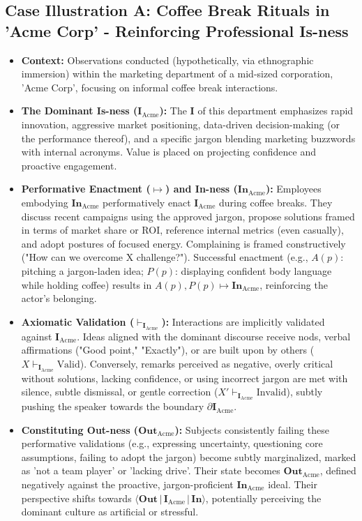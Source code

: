 \documentclass{article}
\newcommand{\Isness}{\mathbf{I}}            %
\newcommand{\Inness}{\mathbf{In}}           %
\newcommand{\Outness}{\mathbf{Out}}         %
\newcommand{\enactment}{\ensuremath{\mapsto}} %
\newcommand{\validates}[1]{\ensuremath{\vdash_{#1}}} %
\newcommand{\boundary}[1]{\ensuremath{\partial #1}} %
\newcommand{\orientation}[3]{\ensuremath{\langle #1 \,|\, #2 \,|\, #3 \rangle}} %
\begin{document}

\subsection{Case Illustration A: Coffee Break Rituals in 'Acme Corp' - Reinforcing Professional Is-ness}

\begin{itemize}
    \item \textbf{Context:} Observations conducted (hypothetically, via ethnographic immersion) within the marketing department of a mid-sized corporation, 'Acme Corp', focusing on informal coffee break interactions.
    \item \textbf{The Dominant Is-ness ($\Isness_{\text{Acme}}$):} The $\Isness$ of this department emphasizes rapid innovation, aggressive market positioning, data-driven decision-making (or the performance thereof), and a specific jargon blending marketing buzzwords with internal acronyms. Value is placed on projecting confidence and proactive engagement.
    \item \textbf{Performative Enactment ($\enactment$) and In-ness ($\Inness_{\text{Acme}}$):} Employees embodying $\Inness_{\text{Acme}}$ performatively enact $\Isness_{\text{Acme}}$ during coffee breaks. They discuss recent campaigns using the approved jargon, propose solutions framed in terms of market share or ROI, reference internal metrics (even casually), and adopt postures of focused energy. Complaining is framed constructively ("How can we overcome X challenge?"). Successful enactment (e.g., $A(p)$: pitching a jargon-laden idea; $P(p)$: displaying confident body language while holding coffee) results in $A(p), P(p) \enactment \Inness_{\text{Acme}}$, reinforcing the actor's belonging.
    \item \textbf{Axiomatic Validation ($\validates{\Isness_{\text{Acme}}}$):} Interactions are implicitly validated against $\Isness_{\text{Acme}}$. Ideas aligned with the dominant discourse receive nods, verbal affirmations ("Good point," "Exactly"), or are built upon by others ($X \validates{\Isness_{\text{Acme}}} \text{Valid}$). Conversely, remarks perceived as negative, overly critical without solutions, lacking confidence, or using incorrect jargon are met with silence, subtle dismissal, or gentle correction ($X' \validates{\Isness_{\text{Acme}}} \text{Invalid}$), subtly pushing the speaker towards the boundary $\boundary{\Isness_{\text{Acme}}}$.
    \item \textbf{Constituting Out-ness ($\Outness_{\text{Acme}}$):} Subjects consistently failing these performative validations (e.g., expressing uncertainty, questioning core assumptions, failing to adopt the jargon) become subtly marginalized, marked as 'not a team player' or 'lacking drive'. Their state becomes $\Outness_{\text{Acme}}$, defined negatively against the proactive, jargon-proficient $\Inness_{\text{Acme}}$ ideal. Their perspective shifts towards $\orientation{\Outness}{\Isness_{\text{Acme}}}{\Inness}$, potentially perceiving the dominant culture as artificial or stressful.

\end{itemize}
\end{document}
